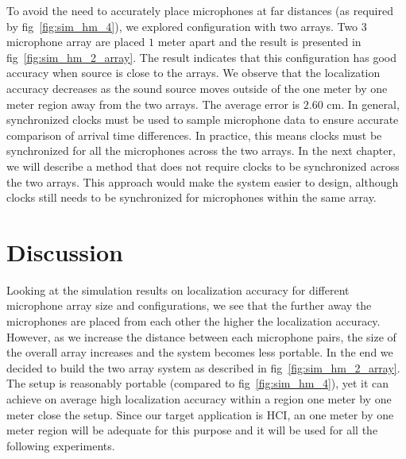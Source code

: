 To avoid the need to accurately place microphones at far distances (as required by fig~\ref{fig:sim_hm_4}), we explored configuration with two arrays. Two $3$ microphone array are placed $1$ meter apart and the result is presented in fig~\ref{fig:sim_hm_2_array}.  The result indicates that this configuration has good accuracy when source is close to the arrays. We observe that the localization accuracy decreases as the sound source moves outside of the one meter by one meter region away from the two arrays. The average error is $2.60$ cm. In general, synchronized clocks must be used to sample microphone data to ensure accurate comparison of arrival time differences. In practice, this means clocks must be synchronized for all the microphones across the two arrays. In the next chapter, we will describe a method that does not require clocks to be synchronized across the two arrays. This approach would make the system easier to design, although clocks still needs to be synchronized for microphones within the same array. 


\section{Discussion}

Looking at the simulation results on localization accuracy for different microphone array size and configurations, we see that the further away the microphones are placed from each other the higher the localization accuracy. However, as we increase the distance between each microphone pairs, the size of the overall array increases and the system becomes less portable. In the end we decided to build the two array system as described in fig~\ref{fig:sim_hm_2_array}. The setup is reasonably portable (compared to fig~\ref{fig:sim_hm_4}), yet it can achieve on average high localization accuracy within a region one meter by one meter close the setup. Since our target application is HCI, an one meter by one meter region will be adequate for this purpose and it will be used for all the following experiments.   
